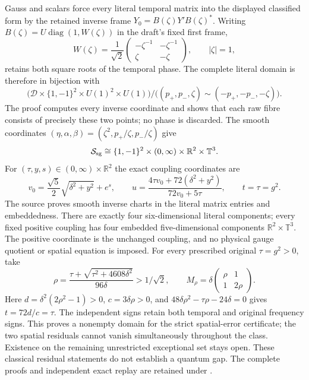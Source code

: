 \documentclass[10pt,letterpaper]{article}
\begin{document}
Gauss and scalars force every literal temporal matrix into the displayed
classified form by the retained inverse frame $Y_0=B(\zeta)Y'B(\zeta)^*$.
Writing $B(\zeta)=U\operatorname{diag}(1,W(\zeta))$ in the draft's
fixed first frame,
\[
 W(\zeta)=\frac1{\sqrt2}
 \begin{pmatrix}-\zeta^{-1}&-\zeta^{-1}\\\zeta&-\zeta\end{pmatrix},
 \qquad |\zeta|=1,
\]
retains both square roots of the temporal phase. The complete literal
domain is therefore in bijection with
\[
 \bigl(\mathcal D\times\{1,-1\}^2\times U(1)^2\times U(1)\bigr)
 /\bigl((p_+,p_-,\zeta)\sim(-p_+,-p_-,-\zeta)\bigr).
\]
The proof computes every inverse coordinate and shows that each raw
fibre consists of precisely these two points; no phase is discarded.
The smooth coordinates
$(\eta,\alpha,\beta)=(\zeta^2,p_+/\zeta,p_-/\zeta)$ give
\[
 \mathcal S_{\rm sg}\cong\{1,-1\}^2\times(0,\infty)
                         \times\mathbb R^2\times\mathbb T^3.
\]
For $(\tau,y,s)\in(0,\infty)\times\mathbb R^2$ the exact coupling
coordinates are
\[
 v_0=\frac{\sqrt5}{2}\sqrt{\delta^2+y^2}+e^s,\qquad
 u=\frac{4\tau v_0+72(\delta^2+y^2)}{72v_0+5\tau},\qquad t=\tau=g^2.
\]
The source  proves smooth inverse
charts in the literal matrix entries and embeddedness. There are exactly
four six-dimensional literal components; every fixed positive coupling
has four embedded five-dimensional components
$\mathbb R^2\times\mathbb T^3$. The positive coordinate is the unchanged
coupling, and no physical gauge quotient or spatial equation is imposed.
For every prescribed original $\tau=g^2>0$, take
\[
 \rho=\frac{\tau+\sqrt{\tau^2+4608\delta^2}}{96\delta}
       >1/\sqrt2,\qquad
 M_\rho=\delta\begin{pmatrix}\rho&1\\1&2\rho\end{pmatrix}.
\]
Here $d=\delta^2(2\rho^2-1)>0$, $c=3\delta\rho>0$, and
$48\delta\rho^2-\tau\rho-24\delta=0$ gives $t=72d/c=\tau$.
The independent signs retain both temporal and original frequency signs.
This proves a nonempty domain for the strict spatial-error certificate;
the two spatial residuals cannot vanish simultaneously throughout the class. Existence
on the remaining unrestricted exceptional set stays open. These classical
residual statements do not establish a quantum gap.
The complete proofs and independent exact replay are retained under
.
\end{document}
